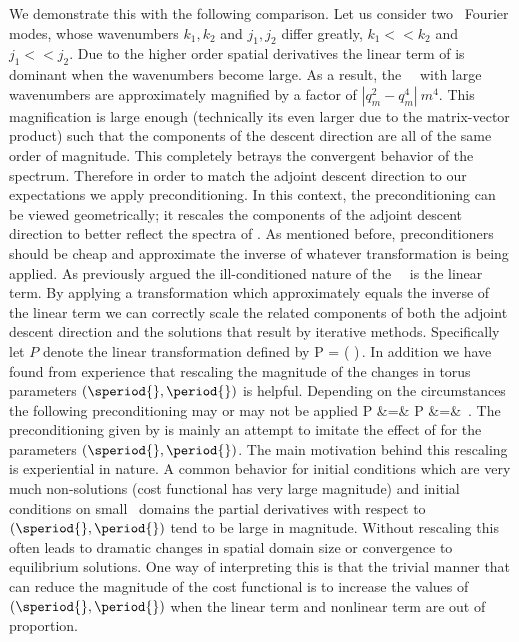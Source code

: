 We demonstrate this with the following comparison. Let us consider
two \spt\ Fourier modes, whose {\spt} wavenumbers $k_1,k_2$ and $j_1,j_2$
differ greatly, $k_1 << k_2 $ and $j_1 << j_2$.
Due to the higher order spatial derivatives the
linear term of  is dominant when the wavenumbers become large.
As a result, the \spt\ \Fcs\ with large wavenumbers are approximately
magnified by a factor of $|q_m^2-q_m^4| ~ m^4$.
This magnification is large enough (technically its even larger due to
the matrix-vector product) such that the components
of the descent direction  are all of the same
order of magnitude. This completely betrays the convergent behavior
of the spectrum. Therefore in order to match the adjoint descent direction
to our expectations we apply preconditioning. In this context, the
preconditioning can be viewed geometrically; it rescales the
components of the adjoint descent direction to better reflect
the spectra of \Fcs.
As mentioned before, preconditioners should be cheap and approximate the
inverse of whatever transformation is being applied.
As previously argued the ill-conditioned nature of the \spt\ \KSe\
is the linear term. By applying a transformation which approximately
equals the inverse of the linear term we can correctly scale the
related components of both the adjoint descent direction and the
solutions that result by iterative methods. Specifically let
$P$ denote the linear transformation defined by
\beq \label{e-preconditioner}
P = \Big( \Big)\,.
\eeq
In addition we have found from experience that rescaling the magnitude of
the changes in torus parameters $(\speriod{},\period{})$ is helpful.
Depending on the circumstances the following preconditioning may or may
not be applied
\bea \label{e-preconditionerTL}
P\cdot \delta \period{} &=& \frac{\delta \period{}}{\period{}} \continue
P\cdot \delta \speriod{} &=& \frac{\delta \speriod{}}{\speriod{}^4}\,.
\eea
The preconditioning given by  is mainly an
attempt to imitate the effect of \refeq{e-preconditioner} for the
parameters $(\speriod{},\period{})$. The main motivation behind this
rescaling is experiential in nature. A common behavior for initial
conditions which are very much non-solutions (cost functional has very
large magnitude) and initial conditions on small \spt\ domains the
partial derivatives with respect to $(\speriod{},\period{})$ tend to be
large in magnitude. Without rescaling this often leads to dramatic
changes in spatial domain size or convergence to equilibrium solutions.
One way of interpreting this is that the trivial manner that can reduce
the magnitude of the cost functional is to increase the values of
$(\speriod{},\period{})$ when the linear term and nonlinear term are out
of proportion.
